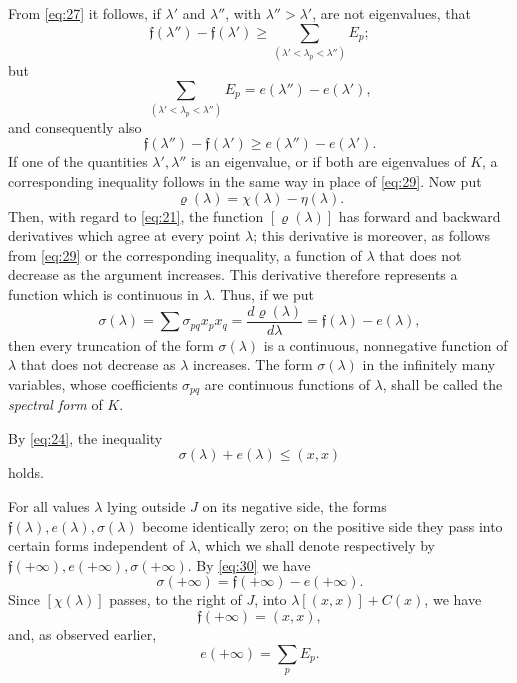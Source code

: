 \documentclass[b5paper,twoside]{article}
\newcommand{\originalpage}[1]{\phantomsection\label{origpage:#1}}
\begin{document}
From \eqref{eq:27} it follows, if $\lambda'$ and $\lambda''$, with
$\lambda''>\lambda'$, are not eigenvalues, that
\[
  \mathfrak f(\lambda'')-\mathfrak f(\lambda')
  \ge\sum_{(\lambda'<\lambda_p<\lambda'')}E_p;
\]
but
\[
  \sum_{(\lambda'<\lambda_p<\lambda'')}E_p
  =e(\lambda'')-e(\lambda'),
\]
and consequently also
\begin{equation}
\tag{29}\label{eq:29}
  \mathfrak f(\lambda'')-\mathfrak f(\lambda')
  \ge e(\lambda'')-e(\lambda').
\end{equation}
If one of the quantities $\lambda',\lambda''$ is an eigenvalue, or if both
are eigenvalues of $K$, a corresponding inequality follows in the same way
in place of \eqref{eq:29}.  Now put
\[
  \varrho(\lambda)=\chi(\lambda)-\eta(\lambda).
\]
Then, with regard to \eqref{eq:21}, the function $[\varrho(\lambda)]$ has
forward and backward derivatives which agree at every point $\lambda$; this
derivative is moreover, as follows from \eqref{eq:29} or the corresponding
inequality, a function of $\lambda$ that does not decrease as the argument
increases.  This derivative therefore represents a function which is
continuous in $\lambda$.  \originalpage{172}Thus, if we put
\begin{equation}
\tag{30}\label{eq:30}
  \sigma(\lambda)=\sum\sigma_{pq}x_p x_q
  =\frac{d\varrho(\lambda)}{d\lambda}
  =\mathfrak f(\lambda)-e(\lambda),
\end{equation}
then every truncation of the form $\sigma(\lambda)$ is a continuous,
nonnegative function of $\lambda$ that does not decrease as $\lambda$
increases.  The form $\sigma(\lambda)$ in the infinitely many variables,
whose coefficients $\sigma_{pq}$ are continuous functions of $\lambda$, shall
be called the \emph{spectral form} of $K$.

By \eqref{eq:24}, the inequality
\begin{equation}
\tag{31}\label{eq:31}
  \sigma(\lambda)+e(\lambda)\le(x,x)
\end{equation}
holds.

For all values $\lambda$ lying outside $J$ on its negative side, the forms
$\mathfrak f(\lambda),e(\lambda),\sigma(\lambda)$ become identically zero; on
the positive side they pass into certain forms independent of $\lambda$,
which we shall denote respectively by
$\mathfrak f(+\infty),e(+\infty),\sigma(+\infty)$.  By \eqref{eq:30} we have
\begin{equation}
\tag{32}\label{eq:32}
  \sigma(+\infty)=\mathfrak f(+\infty)-e(+\infty).
\end{equation}
Since $[\chi(\lambda)]$ passes, to the right of $J$, into
$\lambda[(x,x)]+C(x)$, we have
\begin{equation}
\tag{33}\label{eq:33}
  \mathfrak f(+\infty)=(x,x),
\end{equation}
and, as observed earlier,
\[
  e(+\infty)=\sum_p E_p.
\]
\end{document}
